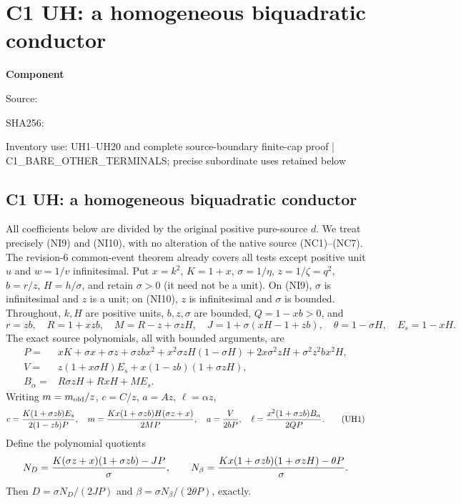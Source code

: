 \chapter{C1 UH: a homogeneous biquadratic conductor}
\label{component:pf7ffa921793c}
\noindent\textbf{Component }\par
{\small\noindent Source: \par}
{\small\noindent SHA256: \par}
{\small\noindent Inventory use: UH1--UH20 and complete source-boundary finite-cap proof | C1\_\allowbreak{}BARE\_\allowbreak{}OTHER\_\allowbreak{}TERMINALS; precise subordinate uses retained below\par}
\medskip
\section{C1 UH: a homogeneous biquadratic conductor}
\label{pf7ffa921793c:sec:r7-c1-uh}
All coefficients below are divided by the original positive pure-source
$d$. We treat precisely (NI9) and (NI10), with no alteration of the native
source (NC1)--(NC7). The revision-6 common-event theorem already covers
all tests except positive unit $u$ and $w=1/v$ infinitesimal.
Put $x=k^2$, $K=1+x$, $\sigma=1/\eta$, $z=1/\zeta=q^2$,
$b=r/z$, $H=h/\sigma$, and retain $\sigma>0$ (it need not be a unit).
On (NI9), $\sigma$ is infinitesimal and $z$ is a unit; on (NI10),
$z$ is infinitesimal and $\sigma$ is bounded. Throughout, $k,H$ are
positive units, $b,z,\sigma$ are bounded, $Q=1-xb>0$, and
\[
 r=zb,\quad R=1+xzb,\quad M=R-z+\sigma zH,
 \quad J=1+\sigma(xH-1+zb),\quad\theta=1-\sigma H,
 \quad E_s=1-xH.
\]
The exact source polynomials, all with bounded arguments, are
\begin{align*}
 P={}&xK+\sigma x+\sigma z+\sigma zb x^2
 +x^2\sigma zH(1-\sigma H)+2x\sigma^2zH
 +\sigma^2z^2bx^2H,\\
 V={}&z(1+x\sigma H)E_s+x(1-zb)(1+\sigma zH),\\
 B_\alpha={}&R\sigma zH+RxH+ME_s.
\end{align*}
Writing $m=m_{\rm old}/z$, $c=C/z$, $a=Az$, $\ell=\alpha z$,
\[
 c={K(1+\sigma zb)E_s\over2(1-zb)P},\quad
 m={Kx(1+\sigma zb)H(\sigma z+x)\over2MP},\quad
 a={V\over2bP},\quad
 \ell={x^2(1+\sigma zb)B_\alpha\over2QP}.                 \tag{UH1}
\]
Define the polynomial quotients
\[
 N_D={K(\sigma z+x)(1+\sigma zb)-JP\over\sigma},\qquad
 N_\beta={Kx(1+\sigma zb)(1+\sigma zH)-\theta P\over\sigma}.
\]
Then $D=\sigma N_D/(2JP)$ and
$\beta=\sigma N_\beta/(2\theta P)$, exactly.

